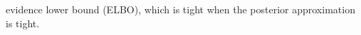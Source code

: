 \documentclass[../../book-main.tex]{subfiles}
\begin{document}
evidence lower bound (ELBO), which is tight when the posterior
approximation is tight.
\end{document}
